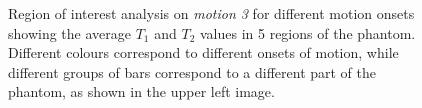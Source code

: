 \begin{figure}[ht]
    \caption{Region of interest analysis on \textit{motion 3} for different motion onsets showing the average $T_1$ and $T_2$ values in 5 regions of the phantom.
    Different colours correspond to different onsets of motion, while different groups of bars correspond to a different part of the phantom, as shown in the upper left image.}
    \label{fig:appendixmotion3ROI}
\end{figure}